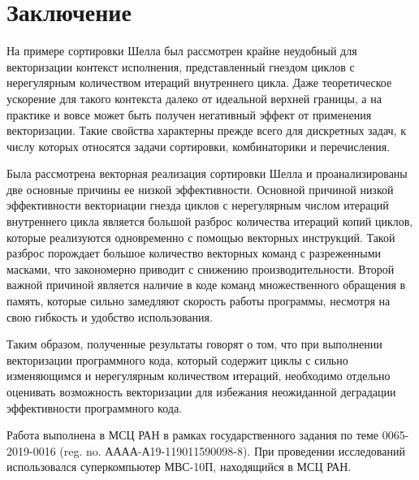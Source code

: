 \documentclass[utf8]{psta}
\begin{document}
\section*{Заключение}

На примере сортировки Шелла был рассмотрен крайне неудобный для векторизации контекст исполнения, представленный гнездом циклов с нерегулярным количеством итераций внутреннего цикла.
Даже теоретическое ускорение для такого контекста далеко от идеальной верхней границы, а на практике и вовсе может быть получен негативный эффект от применения векторизации.
Такие свойства характерны прежде всего для дискретных задач, к числу которых относятся задачи сортировки, комбинаторики и перечисления.

Была рассмотрена векторная реализация сортировки Шелла и проанализированы две основные причины ее низкой эффективности.
Основной причиной низкой эффективности векториации гнезда циклов с нерегулярным числом итераций внутреннего цикла является большой разброс количества итераций копий циклов, которые реализуются одновременно с помощью векторных инструкций.
Такой разброс порождает большое количество векторных команд с разреженными масками, что закономерно приводит с снижению производительности.
Второй важной причиной является наличие в коде команд множественного обращения в память, которые сильно замедляют скорость работы программы, несмотря на свою гибкость и удобство использования.

Таким образом, полученные результаты говорят о том, что при выполнении векторизации программного кода, который содержит циклы с сильно изменяющимся и нерегулярным количеством итераций, необходимо отдельно оценивать возможность векторизации для избежания неожиданной деградации эффективности программного кода.

Работа выполнена в МСЦ РАН в рамках государственного задания по теме 0065-2019-0016 (reg. no. АААА-А19-119011590098-8). При проведении исследований использовался суперкомпьютер МВС-10П, находящийся в МСЦ РАН.
\end{document}
